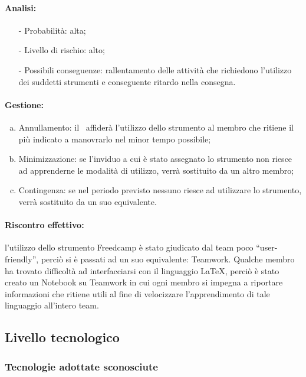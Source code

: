 \documentclass[../PianoProgetto.tex]{subfiles}
\begin{document}
	\paragraph*{Analisi:}
	\begin{itemize}
		\item[-] Probabilità: alta;
		\item[-] Livello di rischio: alto;
		\item[-] Possibili conseguenze: rallentamento delle attività che richiedono l’utilizzo dei suddetti strumenti e conseguente ritardo nella consegna.
	\end{itemize}
	
	\paragraph*{Gestione:}
	\begin{enumerate}[(a)]
		\item Annullamento: il \responsabilediprogetto\ affiderà l’utilizzo dello strumento al membro che ritiene il più indicato a manovrarlo nel minor tempo possibile;
		\item Minimizzazione: se l’inviduo a cui è stato assegnato lo strumento non riesce ad apprenderne le modalità di utilizzo, verrà sostituito da un altro membro;
		\item Contingenza: se nel periodo previsto nessuno riesce ad utilizzare lo strumento, verrà sostituito da un suo equivalente. 
	\end{enumerate}	
	
	\paragraph*{Riscontro effettivo:} l’utilizzo dello strumento Freedcamp è stato giudicato dal team poco “user-friendly”, perciò si è passati ad un suo equivalente: Teamwork. 	Qualche membro ha trovato difficoltà ad interfacciarsi con il linguaggio LaTeX, perciò è stato creato un Notebook su Teamwork in cui ogni membro si impegna a riportare informazioni che ritiene utili al fine di velocizzare l’apprendimento di tale linguaggio all’intero team.

\subsection{Livello tecnologico}

\subsubsection{Tecnologie adottate sconosciute}
\end{document}
